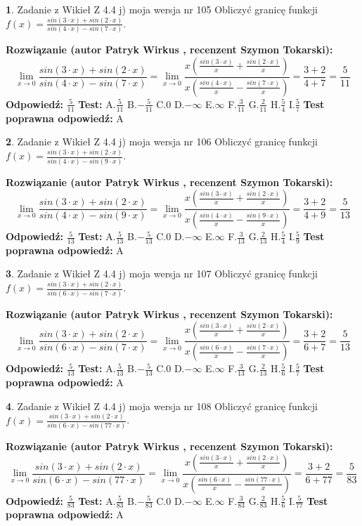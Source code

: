 \documentclass[12pt, a4paper]{article}
\theoremstyle{definition} %
\newtheorem{zad}{}
\newcommand{\zadStart}[1]{\begin{zad}#1\newline}
\newcommand{\zadStop}{\end{zad}}
\newcommand{\rozwStart}[2]{\noindent \textbf{Rozwiązanie (autor #1 , recenzent #2): }\newline}
\newcommand{\rozwStop}{\newline}
\newcommand{\odpStart}{\noindent \textbf{Odpowiedź:}\newline}
\newcommand{\odpStop}{\newline}
\newcommand{\testStart}{\noindent \textbf{Test:}\newline}
\newcommand{\testStop}{\newline}
\newcommand{\kluczStart}{\noindent \textbf{Test poprawna odpowiedź:}\newline}
\newcommand{\kluczStop}{\newline}
\begin{document}
\zadStart{Zadanie z Wikieł Z 4.4 j) moja wersja nr 105}
Obliczyć granicę funkcji $f(x)=\frac{sin(3\cdot x) +sin(2\cdot x)}{sin(4\cdot x) -sin(7\cdot x)}$.
\zadStop
\rozwStart{Patryk Wirkus}{Szymon Tokarski}
$$\lim\limits_{x\to 0}\frac{sin(3\cdot x) +sin(2\cdot x)}{sin(4\cdot x) -sin(7\cdot x)}=\lim\limits_{x\to 0}\frac{x(\frac{sin(3\cdot x)}{x}+\frac{sin(2\cdot x)}{x})}{x(\frac{sin(4\cdot x)}{x}-\frac{sin(7\cdot x)}{x})}=\frac{3+2}{4+7} = \frac{5}{11}$$
\rozwStop
\odpStart
$\frac{5}{11}$
\odpStop
\testStart
A.$\frac{5}{11}$
B.$-\frac{5}{11}$
C.$0$
D.$-\infty$
E.$\infty$
F.$\frac{3}{11}$
G.$\frac{2}{11}$
H.$\frac{5}{4}$
I.$\frac{5}{7}$
\testStop
\kluczStart
A
\kluczStop



\zadStart{Zadanie z Wikieł Z 4.4 j) moja wersja nr 106}
Obliczyć granicę funkcji $f(x)=\frac{sin(3\cdot x) +sin(2\cdot x)}{sin(4\cdot x) -sin(9\cdot x)}$.
\zadStop
\rozwStart{Patryk Wirkus}{Szymon Tokarski}
$$\lim\limits_{x\to 0}\frac{sin(3\cdot x) +sin(2\cdot x)}{sin(4\cdot x) -sin(9\cdot x)}=\lim\limits_{x\to 0}\frac{x(\frac{sin(3\cdot x)}{x}+\frac{sin(2\cdot x)}{x})}{x(\frac{sin(4\cdot x)}{x}-\frac{sin(9\cdot x)}{x})}=\frac{3+2}{4+9} = \frac{5}{13}$$
\rozwStop
\odpStart
$\frac{5}{13}$
\odpStop
\testStart
A.$\frac{5}{13}$
B.$-\frac{5}{13}$
C.$0$
D.$-\infty$
E.$\infty$
F.$\frac{3}{13}$
G.$\frac{2}{13}$
H.$\frac{5}{4}$
I.$\frac{5}{9}$
\testStop
\kluczStart
A
\kluczStop



\zadStart{Zadanie z Wikieł Z 4.4 j) moja wersja nr 107}
Obliczyć granicę funkcji $f(x)=\frac{sin(3\cdot x) +sin(2\cdot x)}{sin(6\cdot x) -sin(7\cdot x)}$.
\zadStop
\rozwStart{Patryk Wirkus}{Szymon Tokarski}
$$\lim\limits_{x\to 0}\frac{sin(3\cdot x) +sin(2\cdot x)}{sin(6\cdot x) -sin(7\cdot x)}=\lim\limits_{x\to 0}\frac{x(\frac{sin(3\cdot x)}{x}+\frac{sin(2\cdot x)}{x})}{x(\frac{sin(6\cdot x)}{x}-\frac{sin(7\cdot x)}{x})}=\frac{3+2}{6+7} = \frac{5}{13}$$
\rozwStop
\odpStart
$\frac{5}{13}$
\odpStop
\testStart
A.$\frac{5}{13}$
B.$-\frac{5}{13}$
C.$0$
D.$-\infty$
E.$\infty$
F.$\frac{3}{13}$
G.$\frac{2}{13}$
H.$\frac{5}{6}$
I.$\frac{5}{7}$
\testStop
\kluczStart
A
\kluczStop



\zadStart{Zadanie z Wikieł Z 4.4 j) moja wersja nr 108}
Obliczyć granicę funkcji $f(x)=\frac{sin(3\cdot x) +sin(2\cdot x)}{sin(6\cdot x) -sin(77\cdot x)}$.
\zadStop
\rozwStart{Patryk Wirkus}{Szymon Tokarski}
$$\lim\limits_{x\to 0}\frac{sin(3\cdot x) +sin(2\cdot x)}{sin(6\cdot x) -sin(77\cdot x)}=\lim\limits_{x\to 0}\frac{x(\frac{sin(3\cdot x)}{x}+\frac{sin(2\cdot x)}{x})}{x(\frac{sin(6\cdot x)}{x}-\frac{sin(77\cdot x)}{x})}=\frac{3+2}{6+77} = \frac{5}{83}$$
\rozwStop
\odpStart
$\frac{5}{83}$
\odpStop
\testStart
A.$\frac{5}{83}$
B.$-\frac{5}{83}$
C.$0$
D.$-\infty$
E.$\infty$
F.$\frac{3}{83}$
G.$\frac{2}{83}$
H.$\frac{5}{6}$
I.$\frac{5}{77}$
\testStop
\kluczStart
A
\kluczStop
\end{document}
